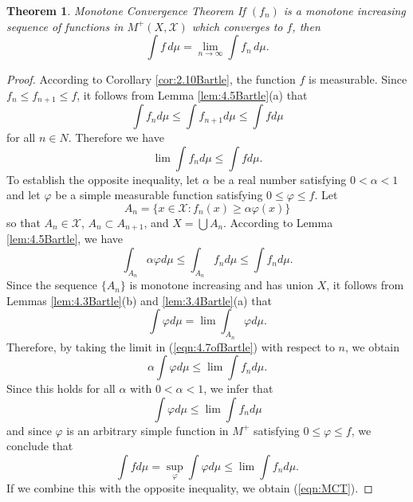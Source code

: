 \documentclass[12pt]{amsart}
\theoremstyle{plain}
\newtheorem{thm}{Theorem}[section]
\theoremstyle{definition}
\theoremstyle{remark}
\numberwithin{equation}{section}
\numberwithin{thm}{section}
\begin{document}
\begin{thm}{Monotone Convergence Theorem}
    If $(f_n)$ is a monotone increasing sequence of functions in $M^+(X, \mathcal{X})$ which converges to $f$, then 
\begin{equation} \label{eqn:MCT}
\int f \, d\mu = \lim_{n \to \infty} \int f_n \, d\mu.
\end{equation}
\end{thm}
\begin{proof}
   According to Corollary \ref{cor:2.10Bartle}, the function $f$ is measurable. Since $f_n \leq f_{n+1} \leq f$, it follows from Lemma \ref{lem:4.5Bartle}(a) that
   \begin{equation*}
       \int f_n d\mu \leq \int f_{n+1}d\mu \leq \int f d\mu
   \end{equation*}
   for all $n \in N$. Therefore we have
   \begin{equation*}
       \lim \int f_n d\mu \leq \int f d\mu.
   \end{equation*}
   To establish the opposite inequality, let $\alpha$ be a real number satisfying $0 < \alpha < 1$ and let $\varphi$ be a simple measurable function satisfying $0 \leq \varphi \leq f$. Let 
   \begin{equation*}
       A_n = \{ x \in \mathcal{X} : f_n(x) \geq \alpha \varphi(x) \}
   \end{equation*}
   so that $A_n \in \mathcal{X}$, $A_n \subset A_{n+1}$, and $X = \bigcup A_n$. According to Lemma \ref{lem:4.5Bartle}, we have
   \begin{equation} \label{eqn:4.7ofBartle}
       \int_{A_n} \alpha \varphi d\mu \leq \int_{A_n} f_n d\mu \leq \int f_n d\mu.   \end{equation}
       Since the sequence $\{A_n\}$ is monotone increasing and has union $X$, it follows from Lemmas \ref{lem:4.3Bartle}(b) and \ref{lem:3.4Bartle}(a) that
       \begin{equation*}
           \int \varphi d\mu = \lim \int_{A_n} \varphi d\mu.
       \end{equation*}
       Therefore, by  taking the limit in (\ref{eqn:4.7ofBartle}) with respect to $n$, we obtain
       \begin{equation*}
           \alpha \int \varphi d\mu \leq \lim \int f_n d\mu.
       \end{equation*}
       Since this holds for all $\alpha$ with $0 <\alpha<1$, we infer that
       \begin{equation*}
           \int \varphi d\mu \leq \lim \int f_n d\mu
       \end{equation*}
       and since $\varphi$ is an arbitrary simple function in $M^+$ satisfying $0 \leq \varphi \leq f$, we conclude that
       \begin{equation*}
           \int f d\mu = \sup_{\varphi} \int \varphi d\mu \leq \lim \int f_n d\mu.
       \end{equation*}
       If we combine this with the opposite inequality, we obtain (\ref{eqn:MCT}).
\end{proof}
 
\end{document}
